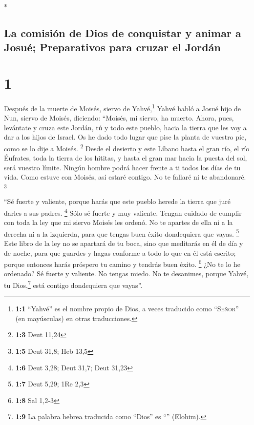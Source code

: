 \begin{paracol}{2} \switchcolumn[0]*

\hypertarget{la-comisiuxf3n-de-dios-de-conquistar-y-animar-a-josuuxe9-preparativos-para-cruzar-el-jorduxe1n}{%
\subsection{La comisión de Dios de conquistar y animar a Josué;
Preparativos para cruzar el
Jordán}\label{la-comisiuxf3n-de-dios-de-conquistar-y-animar-a-josuuxe9-preparativos-para-cruzar-el-jorduxe1n}}

\hypertarget{section}{%
\section{1}\label{section}}

 Después de la muerte de Moisés, siervo de
Yahvé,\footnote{\textbf{1:1} ``Yahvé'' es el nombre propio de Dios, a
  veces traducido como ``\textsc{Señor}'' (en mayúsculas) en otras
  traducciones.} Yahvé habló a Josué hijo de Nun, siervo de Moisés,
diciendo:  ``Moisés, mi siervo, ha muerto. Ahora, pues,
levántate y cruza este Jordán, tú y todo este pueblo, hacia la tierra
que les voy a dar a los hijos de Israel.  Os he dado todo
lugar que pise la planta de vuestro pie, como se lo dije a Moisés.
\footnote{\textbf{1:3} Deut 11,24}  Desde el desierto y
este Líbano hasta el gran río, el río Éufrates, toda la tierra de los
hititas, y hasta el gran mar hacia la puesta del sol, será vuestro
límite.  Ningún hombre podrá hacer frente a ti todos los
días de tu vida. Como estuve con Moisés, así estaré contigo. No te
fallaré ni te abandonaré. \footnote{\textbf{1:5} Deut 31,8; Heb 13,5}

 ``Sé fuerte y valiente, porque harás que este pueblo
herede la tierra que juré darles a sus padres. \footnote{\textbf{1:6}
  Deut 3,28; Deut 31,7; Deut 31,23}  Sólo sé fuerte y muy
valiente. Tengan cuidado de cumplir con toda la ley que mi siervo Moisés
les ordenó. No te apartes de ella ni a la derecha ni a la izquierda,
para que tengas buen éxito dondequiera que vayas. \footnote{\textbf{1:7}
  Deut 5,29; 1Re 2,3}  Este libro de la ley no se apartará
de tu boca, sino que meditarás en él de día y de noche, para que guardes
y hagas conforme a todo lo que en él está escrito; porque entonces harás
próspero tu camino y tendrás buen éxito. \footnote{\textbf{1:8} Sal
  1,2-3}  ¿No te lo he ordenado? Sé fuerte y valiente. No
tengas miedo. No te desanimes, porque Yahvé, tu Dios,\footnote{\textbf{1:9}
  La palabra hebrea traducida como ``Dios'' es ``''
  (Elohim).} está contigo dondequiera que vayas''.


\end{paracol}
